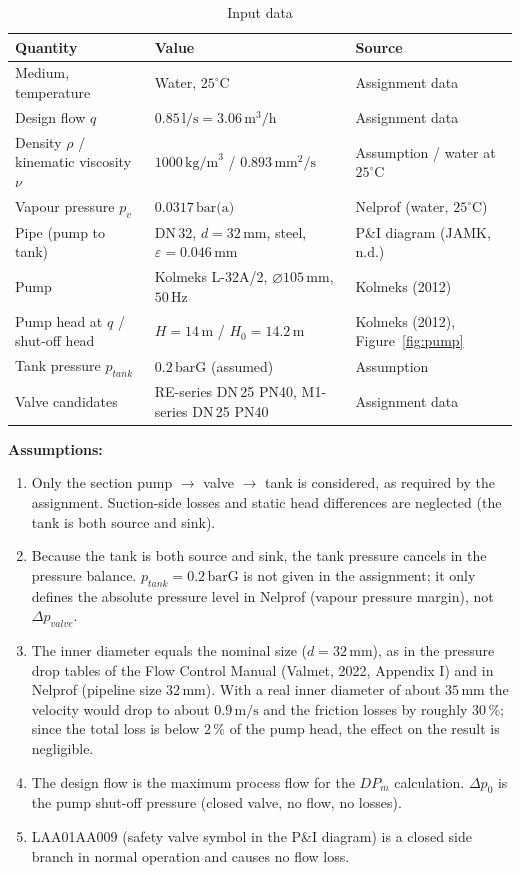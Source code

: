 \documentclass[11pt,a4paper]{article}
\begin{document}
\begin{table}[H]
\centering
\caption{Input data}
\label{tab:input}
\small
\begin{tabularx}{\textwidth}{@{}lXl@{}}
\toprule
Quantity & Value & Source \\
\midrule
Medium, temperature & Water, $25^\circ\text{C}$ & Assignment data \\
Design flow $q$ & $0.85\,\text{l/s} = 3.06\,\text{m}^3/\text{h}$ & Assignment data \\
Density $\rho$ / kinematic viscosity $\nu$ & $1000\,\text{kg/m}^3$ / $0.893\,\text{mm}^2/\text{s}$ & Assumption / water at $25^\circ\text{C}$ \\
Vapour pressure $p_v$ & $0.0317\,\text{bar(a)}$ & Nelprof (water, $25^\circ\text{C}$) \\
Pipe (pump to tank) & DN\,32, $d = 32\,\text{mm}$, steel, $\varepsilon = 0.046\,\text{mm}$ & P\&I diagram (JAMK, n.d.) \\
Pump & Kolmeks L-32A/2, $\varnothing 105\,\text{mm}$, $50\,\text{Hz}$ & Kolmeks (2012) \\
Pump head at $q$ / shut-off head & $H = 14\,\text{m}$ / $H_0 = 14.2\,\text{m}$ & Kolmeks (2012), Figure~\ref{fig:pump} \\
Tank pressure $p_{tank}$ & $0.2\,\text{barG}$ (assumed) & Assumption \\
Valve candidates & RE-series DN\,25 PN40, M1-series DN\,25 PN40 & Assignment data \\
\bottomrule
\end{tabularx}
\end{table}

\textbf{Assumptions:}
\begin{enumerate}[label=A\arabic*,leftmargin=*,nosep]
    \item Only the section pump $\rightarrow$ valve $\rightarrow$ tank is considered, as required by the assignment. Suction-side losses and static head differences are neglected (the tank is both source and sink).
    \item Because the tank is both source and sink, the tank pressure cancels in the pressure balance. $p_{tank} = 0.2\,\text{barG}$ is not given in the assignment; it only defines the absolute pressure level in Nelprof (vapour pressure margin), not $\Delta p_{valve}$.
    \item The inner diameter equals the nominal size ($d = 32\,\text{mm}$), as in the pressure drop tables of the Flow Control Manual (Valmet, 2022, Appendix I) and in Nelprof (pipeline size 32\,mm). With a real inner diameter of about $35\,\text{mm}$ the velocity would drop to about $0.9\,\text{m/s}$ and the friction losses by roughly $30\,\%$; since the total loss is below $2\,\%$ of the pump head, the effect on the result is negligible.
    \item The design flow is the maximum process flow for the $DP_m$ calculation. $\Delta p_0$ is the pump shut-off pressure (closed valve, no flow, no losses).
    \item LAA01AA009 (safety valve symbol in the P\&I diagram) is a closed side branch in normal operation and causes no flow loss.
\end{enumerate}
\end{document}

